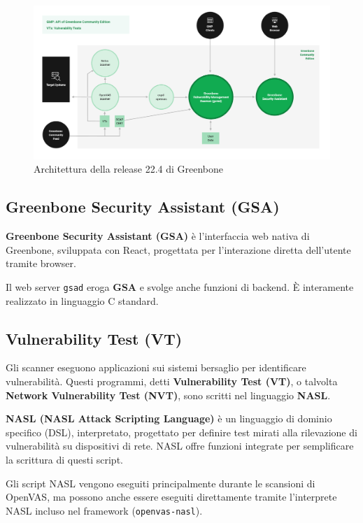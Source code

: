 \begin{figure}[h!]
    \includegraphics[width=\textwidth]{img/greenbone-community-22.4-architecture.png}
    \caption{Architettura della release 22.4 di Greenbone}
\end{figure}

\subsection{Greenbone Security Assistant (GSA)}
\textbf{Greenbone Security Assistant (GSA)} è l'interfaccia web nativa di Greenbone, sviluppata con React, progettata per l'interazione diretta dell'utente tramite browser.

Il web server \texttt{gsad} eroga \textbf{GSA} e svolge anche funzioni di backend. \`E interamente realizzato in linguaggio C standard.

\subsection{Vulnerability Test (VT)}
Gli scanner eseguono applicazioni sui sistemi bersaglio per identificare vulnerabilità. Questi programmi, detti \textbf{Vulnerability Test (VT)}, o talvolta \textbf{Network Vulnerability Test (NVT)}, sono scritti nel linguaggio \textbf{NASL}.

\textbf{NASL (NASL Attack Scripting Language)} \`e un linguaggio di dominio specifico (DSL), interpretato, progettato per definire test mirati alla rilevazione di vulnerabilità su dispositivi di rete. NASL offre funzioni integrate per semplificare la scrittura di questi script.

Gli script NASL vengono eseguiti principalmente durante le scansioni di OpenVAS, ma possono anche essere eseguiti direttamente tramite l'interprete NASL incluso nel framework (\texttt{openvas-nasl}).

